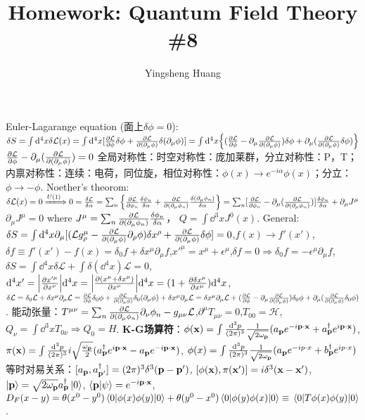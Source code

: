 \documentclass[11pt]{article}
\title{Homework: Quantum Field Theory \#8}
\author{Yingsheng Huang}
\newcommand{\id}{\int\dd^4x}
\newcommand{\lag}{\mathcal{L}}
\newcommand{\vbp}{\vb{p}}
\renewcommand{\a}{\alpha}
\newcommand{\ddv}[2]{\frac{\delta{#1}}{\delta{#2}}}
\newcommand{\pa}{\partial}
\begin{document}
Euler-Lagarange equation (面上$\delta\phi=0$): $\delta S=\int\dd^4x\delta \lag(x)=\int\dd^4x[\pdv{\lag}{\phi}\delta\phi+\pdv{\lag}{(\partial_{\mu}\phi)}\delta(\partial_{\mu}\phi)]=\int\dd^4x\Bqty{(\pdv{\lag}{\phi}-\partial_{\mu}\pdv{\lag}{(\partial_{\mu}\phi)})\delta\phi+\partial_{\mu}(\pdv{\lag}{(\partial_{\mu}\phi)}\delta\phi)}$
$\pdv{\lag}{\phi}-\partial_{\mu}(\pdv{\lag}{(\partial_{\mu}\phi)})=0$
全局对称性：时空对称性：庞加莱群，分立对称性：P，T；内禀对称性：连续：电荷，同位旋，相位对称性：$\phi(x)\rightarrow e^{-i\a}\phi(x)$；分立：$\phi\rightarrow-\phi$.
Noether's theorom: $\delta\lag(x)=0\xLongrightarrow{U(1)}0=\ddv{\lag}{\a}=\sum_n\Bqty{\pdv{\lag}{\phi_n}\ddv{\phi_n}{\a}+\pdv{\lag}{(\partial_{\mu}\phi_n)}\ddv{(\partial_{\mu}\phi_n)}{\a}}=\sum_n[\pdv{\lag}{\phi_n}-\partial_{\mu}(\pdv{\lag}{(\partial_{\mu}\phi_n)})]\ddv{\phi_n}{\a}+\partial_{\mu}J^{\mu}$
$\partial_{\mu}J^{\mu}=0$ where $J^{\mu}=\sum_n\pdv{\lag}{(\partial_{\mu}\phi_n)}\ddv{\phi_n}{\a}$， $Q=\int\dd^3x J^0(x)$. General: $\delta S=\int\dd^4x\partial_{\mu}[(\mathcal{L}g^{\mu}_{\rho}-\pdv{\mathcal{L}}{(\partial_{\mu}\phi)}\partial_{\rho}\phi)\delta x^{\rho}+\pdv{\mathcal{L}}{(\partial_{\mu}\phi)}\delta\phi]=0$,$f(x)\rightarrow f'(x')$,$\delta f\equiv f'(x')-f(x)=\delta_0f+\delta x^{\mu}\pa_{\mu}f$,$x'^{\mu}=x^{\mu}+\epsilon^{\mu}$,$\delta f=0\Longrightarrow\delta_0 f=-\epsilon^{\mu}\pa_{\mu}f$,
$\delta S=\id\delta\lag+\int\delta(\dd^4x)\lag=0$,$\dd^4x'=\abs{\pdv{x'^{\mu}}{x^{\nu}}}\dd^4x=\abs{\pdv{(x^{\mu}+\delta x^{\mu})}{x^{\nu}}}\dd^4x=(1+\pdv{\delta x^{\mu}}{x^{\mu}})\dd^4x$,
$\delta\lag=\delta_0\lag+\delta x^{\mu}\partial_{\mu}\lag=\pdv{\lag}{\phi}\delta_0\phi+\pdv{\lag}{(\partial_{\mu}\phi)}\delta_0(\partial_{\mu}\phi)+\delta x^{\mu}\partial_{\mu}\lag=\delta x^{\mu}\partial_{\mu}\lag+(\pdv{\lag}{\phi}-\partial_{\mu}\pdv{\lag}{(\partial_{\mu}\phi)})\delta_0\phi+\partial_{\mu}(\pdv{\lag}{(\partial_{\mu}\phi)}\delta_0\phi)$.
能动张量：$T^{\mu\nu}=\sum_n\pdv{\lag}{(\pa_{\mu}\phi_n)}\pa_{\nu}\phi_n-g_{\mu\nu}\lag$,$\pa^{\mu}T_{\mu\nu}=0$,$T_{00}=\mathcal{H}$,$Q_{\nu}=\int\dd^3xT_{0\nu}\Longrightarrow Q_0=H$.
{\bf K-G场算符}：$\phi(\vb{x})=\int\frac{\dd^3p}{(2\pi)^3}\frac{1}{\sqrt{2\omega_{\vb{p}}}}(a_{\vb{p}}e^{-i\vb{p\cdot x}}+a_{\vb{p}}^{\dagger}e^{i\vb{p\cdot x}})$, $\pi(\vb{x})=\int\frac{\dd^3p}{(2\pi)^3}i\sqrt{\frac{\omega_{\vb{p}}}{2}}(a_{\vb{p}}^{\dagger}e^{i\vb{p\cdot x}}-a_{\vb{p}}e^{-i\vb{p\cdot x}})$, $\phi(x)=\int\frac{\dd^3p}{(2\pi)^3}\frac{1}{\sqrt{2\omega_{\vb{p}}}}(a_{\vb{p}}e^{-ip\cdot x}+b_{\vb{p}}^{\dagger}e^{ip\cdot x})$
等时对易关系：$[a_{\vbp},a_{\vbp'}^{\dagger}]=(2\pi)^3\delta^3(\vbp-\vbp')$, $[\phi(\vb{x}),\pi(\vb{x'})]=i\delta^3(\vb{x-x'})$, $\ket{\vbp}=\sqrt{2\omega_{\vbp}}a_{\vbp}^{\dagger}\ket{0}$, $\braket{\vbp}{\psi}=e^{-i\vb{p\cdot x}}$, $D_F(x-y)=\theta(x^0-y^0)\mel{0}{\phi(x)\phi(y)}{0}+\theta(y^0-x^0)\mel{0}{\phi(y)\phi(x)}{0}\equiv\mel{0}{T\phi(x)\phi(y)}{0}$.
\end{document}
